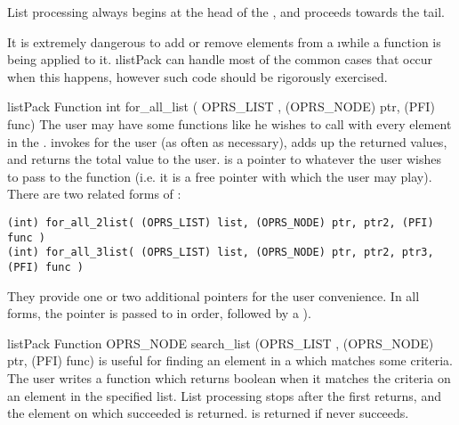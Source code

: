 List processing always begins at the head of the , and proceeds
towards the tail.

 It is extremely dangerous to add or remove elements from
a  \i{while a function is being applied to it}. \i{listPack} can
handle most of the common cases that occur when this happens, however such code
should be rigorously exercised.

\begin{typefn}{listPack Function} {int} {for\_all\_list} {( OPRS\_LIST ,
(OPRS\_NODE) ptr, (PFI) func)}
The user may have some functions like  he wishes to call with every element in the .  invokes  for the user (as
often as necessary), adds up the returned values, and returns the total value
to the user.  is a pointer to whatever the user wishes
to pass to the function (i.e. it is a free pointer with which the user may
play). There are two related forms of :

\begin{verbatim}
(int) for_all_2list( (OPRS_LIST) list, (OPRS_NODE) ptr, ptr2, (PFI) func )
(int) for_all_3list( (OPRS_LIST) list, (OPRS_NODE) ptr, ptr2, ptr3, (PFI) func )
\end{verbatim}

They provide one or two additional pointers for the user convenience.
In all forms, the pointer is passed to  in order, followed
by a  ).
\end{typefn}

\begin{typefn}{listPack Function} {OPRS\_NODE} {search\_list} {(OPRS\_LIST ,
(OPRS\_NODE) ptr, (PFI) func)}
 is useful for finding an element in a 
which matches some criteria. The user writes a function  which returns boolean  when it
matches the criteria on an element in the specified list. List processing
stops after the first
 returns, and the element on which  succeeded is
returned.  is returned if  never succeeds.
\end{typefn}

